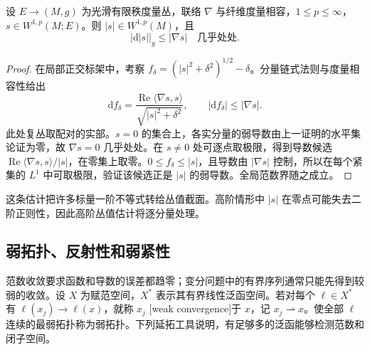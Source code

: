 \begin{proposition}\label{g3:prop:weak-kato}
	设 \(E\to(M,g)\) 为光滑有限秩度量丛，联络 \(\nabla\) 与纤维度量相容，\(1\le p\le\infty\)，\(s\in W^{1,p}(M;E)\)。则 \(|s|\in W^{1,p}(M)\)，且
	\[
		|\mathrm d|s||_g\le|\nabla s|\quad\text{几乎处处}.
	\]
\end{proposition}
\begin{proof}
	在局部正交标架中，考察 \(f_\delta=(|s|^2+\delta^2)^{1/2}-\delta\)。分量链式法则与度量相容性给出
	\[
		\mathrm df_\delta=\frac{\operatorname{Re}\langle\nabla s,s\rangle}{\sqrt{|s|^2+\delta^2}},\qquad
		|\mathrm df_\delta|\le|\nabla s|.
	\]
	此处复丛取配对的实部。\(s=0\) 的集合上，各实分量的弱导数由上一证明的水平集论证为零，故 \(\nabla s=0\) 几乎处处。在 \(s\ne0\) 处可逐点取极限，得到导数候选 \(\operatorname{Re}\langle\nabla s,s\rangle/|s|\)，在零集上取零。\(0\le f_\delta\le|s|\)，且导数由 \(|\nabla s|\) 控制，所以在每个紧集的 \(L^1\) 中可取极限，验证该候选正是 \(|s|\) 的弱导数。全局范数界随之成立。
\end{proof}

这条估计把许多标量一阶不等式转给丛值截面。高阶情形中 \(|s|\) 在零点可能失去二阶正则性，因此高阶丛值估计将逐分量处理。

\subsection{弱拓扑、反射性和弱紧性}
\label{g3:subsec:1102:04}
范数收敛要求函数和导数的误差都趋零；变分问题中的有界序列通常只能先得到较弱的收敛。设 \(X\) 为赋范空间，\(X^*\) 表示其有界线性泛函空间。若对每个 \(\ell\in X^*\) 有 \(\ell(x_j)\to\ell(x)\)，就称 \(x_j\) [weak convergence]于 \(x\)，记 \(x_j\rightharpoonup x\)。使全部 \(\ell\) 连续的最弱拓扑称为弱拓扑。下列延拓工具说明，有足够多的泛函能够检测范数和闭子空间。

